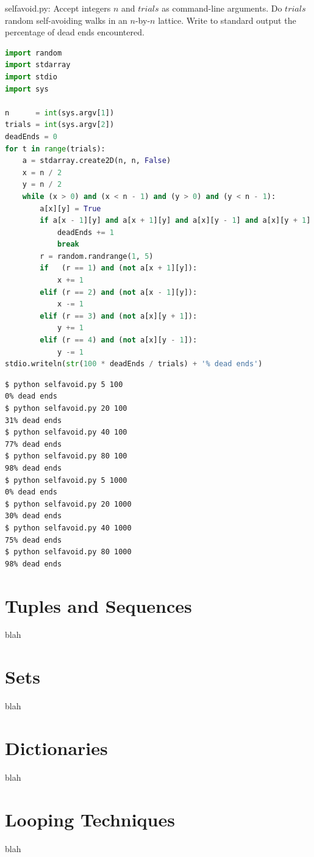 \documentclass[8pt,a4paper,compress,handout]{beamer}
\begin{document}
\begin{frame}[fragile]
\begin{framed}
\tiny selfavoid.py: Accept integers $n$ and $trials$ as command-line arguments. Do $trials$ random self-avoiding walks in an $n$-by-$n$ lattice. Write to standard output the percentage of dead ends encountered.
\end{framed}

\begin{lstlisting}[language=Python]
import random
import stdarray
import stdio
import sys

n      = int(sys.argv[1])
trials = int(sys.argv[2])
deadEnds = 0
for t in range(trials):
    a = stdarray.create2D(n, n, False)
    x = n / 2
    y = n / 2
    while (x > 0) and (x < n - 1) and (y > 0) and (y < n - 1):
        a[x][y] = True
        if a[x - 1][y] and a[x + 1][y] and a[x][y - 1] and a[x][y + 1]:
            deadEnds += 1
            break
        r = random.randrange(1, 5)
        if   (r == 1) and (not a[x + 1][y]):
            x += 1
        elif (r == 2) and (not a[x - 1][y]):
            x -= 1
        elif (r == 3) and (not a[x][y + 1]):
            y += 1
        elif (r == 4) and (not a[x][y - 1]):
            y -= 1
stdio.writeln(str(100 * deadEnds / trials) + '% dead ends')
\end{lstlisting}
\end{frame}

\begin{frame}[fragile]
\begin{lstlisting}[language={}]
$ python selfavoid.py 5 100
0% dead ends
$ python selfavoid.py 20 100
31% dead ends
$ python selfavoid.py 40 100
77% dead ends
$ python selfavoid.py 80 100
98% dead ends
$ python selfavoid.py 5 1000
0% dead ends
$ python selfavoid.py 20 1000
30% dead ends
$ python selfavoid.py 40 1000
75% dead ends
$ python selfavoid.py 80 1000
98% dead ends
\end{lstlisting}
\end{frame}

\section{Tuples and Sequences}
\begin{frame}[fragile]
blah
\end{frame}

\section{Sets}
\begin{frame}[fragile]
blah
\end{frame}

\section{Dictionaries}
\begin{frame}[fragile]
blah
\end{frame}

\section{Looping Techniques}
\begin{frame}[fragile]
blah
\end{frame}
\end{document}

